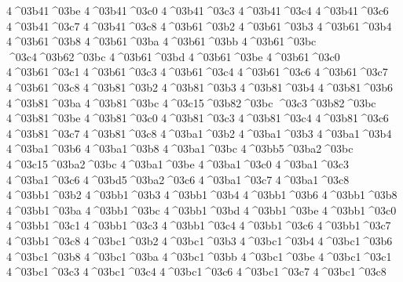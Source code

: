 {4^^^^03b41^^^^03be
4^^^^03b41^^^^03c0
4^^^^03b41^^^^03c3
4^^^^03b41^^^^03c4
4^^^^03b41^^^^03c6
4^^^^03b41^^^^03c7
4^^^^03b41^^^^03c8
4^^^^03b61^^^^03b2 %
4^^^^03b61^^^^03b3 %
4^^^^03b61^^^^03b4
4^^^^03b61^^^^03b8
4^^^^03b61^^^^03ba
4^^^^03b61^^^^03bb
4^^^^03b61^^^^03bc
^^^^03c4^^^^03b62^^^^03bc %
4^^^^03b61^^^^03bd
4^^^^03b61^^^^03be
4^^^^03b61^^^^03c0
4^^^^03b61^^^^03c1
4^^^^03b61^^^^03c3
4^^^^03b61^^^^03c4
4^^^^03b61^^^^03c6
4^^^^03b61^^^^03c7
4^^^^03b61^^^^03c8
4^^^^03b81^^^^03b2
4^^^^03b81^^^^03b3
4^^^^03b81^^^^03b4
4^^^^03b81^^^^03b6
4^^^^03b81^^^^03ba
4^^^^03b81^^^^03bc
4^^^^03c15^^^^03b82^^^^03bc %
^^^^03c3^^^^03b82^^^^03bc   %
4^^^^03b81^^^^03be
4^^^^03b81^^^^03c0
4^^^^03b81^^^^03c3
4^^^^03b81^^^^03c4
4^^^^03b81^^^^03c6
4^^^^03b81^^^^03c7
4^^^^03b81^^^^03c8
4^^^^03ba1^^^^03b2 %
4^^^^03ba1^^^^03b3
4^^^^03ba1^^^^03b4
4^^^^03ba1^^^^03b6
4^^^^03ba1^^^^03b8
4^^^^03ba1^^^^03bc
4^^^^03bb5^^^^03ba2^^^^03bc %
4^^^^03c15^^^^03ba2^^^^03bc %
4^^^^03ba1^^^^03be
4^^^^03ba1^^^^03c0
4^^^^03ba1^^^^03c3
4^^^^03ba1^^^^03c6
4^^^^03bd5^^^^03ba2^^^^03c6 %
4^^^^03ba1^^^^03c7
4^^^^03ba1^^^^03c8
4^^^^03bb1^^^^03b2
4^^^^03bb1^^^^03b3
4^^^^03bb1^^^^03b4
4^^^^03bb1^^^^03b6
4^^^^03bb1^^^^03b8
4^^^^03bb1^^^^03ba
4^^^^03bb1^^^^03bc
4^^^^03bb1^^^^03bd
4^^^^03bb1^^^^03be
4^^^^03bb1^^^^03c0
4^^^^03bb1^^^^03c1
4^^^^03bb1^^^^03c3
4^^^^03bb1^^^^03c4
4^^^^03bb1^^^^03c6
4^^^^03bb1^^^^03c7
4^^^^03bb1^^^^03c8
4^^^^03bc1^^^^03b2
4^^^^03bc1^^^^03b3
4^^^^03bc1^^^^03b4
4^^^^03bc1^^^^03b6
4^^^^03bc1^^^^03b8
4^^^^03bc1^^^^03ba
4^^^^03bc1^^^^03bb
4^^^^03bc1^^^^03be
4^^^^03bc1^^^^03c1
4^^^^03bc1^^^^03c3
4^^^^03bc1^^^^03c4
4^^^^03bc1^^^^03c6
4^^^^03bc1^^^^03c7
4^^^^03bc1^^^^03c8
}
